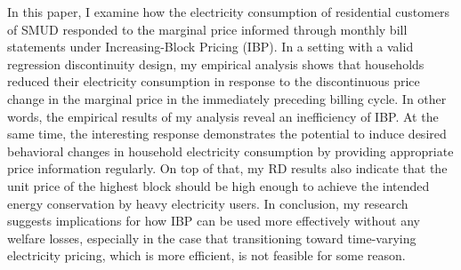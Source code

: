 In this paper, I examine how the electricity consumption of residential customers of SMUD responded to the marginal price informed through monthly bill statements under Increasing-Block Pricing (IBP). In a setting with a valid regression discontinuity design, my empirical analysis shows that households reduced their electricity consumption in response to the discontinuous price change in the marginal price in the immediately preceding billing cycle. In other words, the empirical results of my analysis reveal an inefficiency of IBP. At the same time, the interesting response demonstrates the potential to induce desired behavioral changes in household electricity consumption by providing appropriate price information regularly. On top of that, my RD results also indicate that the unit price of the highest block should be high enough to achieve the intended energy conservation by heavy electricity users. In conclusion, my research suggests implications for how IBP can be used more effectively without any welfare losses, especially in the case that transitioning toward time-varying electricity pricing, which is more efficient, is not feasible for some reason. 